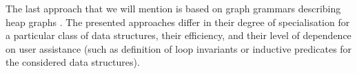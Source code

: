 The last approach that we will mention is based on graph grammars describing heap graphs \cite{Jonathan:Shape, Jonathan:Grammars}. The presented approaches differ in their degree of specialisation for a particular class of data structures, their efficiency, and their level of dependence on user assistance (such as definition of loop invariants or inductive predicates for the considered data structures).
%
%
%  


